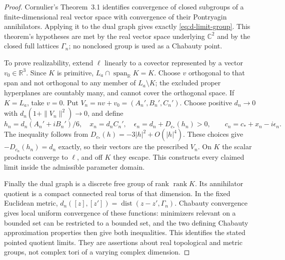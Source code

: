 \begin{proof}
Cornulier's Theorem~3.1 identifies convergence of closed subgroups of
a finite-dimensional real vector space with convergence of their
Pontryagin annihilators. Applying it to the dual graph gives exactly
\eqref{eq:d-limit-group}. This theorem's hypotheses are met by the
real vector space underlying \(\mathbb C^2\) and by the closed full
lattices \(\Gamma_n\); no nonclosed group is used as a Chabauty
point.

To prove realizability, extend \(\ell\) linearly to a covector
represented by a vector \(v_0\in\mathbb R^3\). Since \(K\) is
primitive, \(L_a\cap\operatorname{span}_{\mathbb R}K=K\).
Choose \(v\) orthogonal to that span and not orthogonal to any member
of \(L_a\setminus K\); the excluded proper hyperplanes are
countably many, and cannot cover the orthogonal space. If
\(K=L_a\), take \(v=0\). Put \(V_n=nv+v_0=(A_n',B_n',C_n')\).
Choose positive \(d_n\to0\) with
\(d_n(1+\|V_n\|^2)\to0\), and define
\[
 h_n=d_n(A_n'+iB_n')/6,\quad x_n=d_nC_n',\quad
 \epsilon_n=d_n+D_{c_*}(h_n)>0,
 \qquad c_n=c_*+x_n-i\epsilon_n.
\]
The inequality follows from \(D_{c_*}(h)=-3|h|^2+O(|h|^4)\).
These choices give \(-D_{c_n}(h_n)=d_n\) exactly, so their vectors
are the prescribed \(V_n\). On \(K\) the scalar products converge
to \(\ell\), and off \(K\) they escape. This constructs every
claimed limit inside the admissible parameter domain.

Finally the dual graph is a discrete free group of rank
\(\operatorname{rank}K\). Its annihilator quotient is a compact
connected real torus of that dimension. In the fixed Euclidean metric,
\(d_n([z],[z'])=\operatorname{dist}(z-z',\Gamma_n)\).
Chabauty convergence gives local uniform convergence of these
functions: minimizers relevant on a bounded set can be restricted to
a bounded set, and the two defining Chabauty approximation properties
then give both inequalities. This identifies the stated pointed
quotient limits. They are assertions about real topological and
metric groups, not complex tori of a varying complex dimension.
\end{proof}

